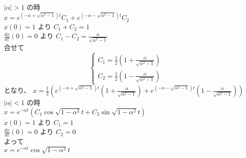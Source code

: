 \documentclass[12pt,a4]{article}
\begin{document}
\medskip
\noindent
$ | \alpha | > 1 $ の時 \\
$ x = e^{(-\alpha+\sqrt{\alpha^2-1})t} C_1 + e^{(-\alpha-\sqrt{\alpha^2-1})t} C_2 $\\
$ x(0) = 1 $ より $ C_1 + C_2 = 1 $ \\
$ \frac{dx}{dt}(0) = 0 $ より $ C_1 - C_2 = \frac{\alpha}{\sqrt{\alpha^2-1}} $ \\
合せて \\
\[
\begin{cases}
  C_1 = \frac{1}{2}(1+\frac{\alpha}{\sqrt{\alpha^2-1}}) \\
  C_2 = \frac{1}{2}(1-\frac{\alpha}{\sqrt{\alpha^2-1}}) 
\end{cases}
\]
となり、
$ x = \frac{1}{2} (e^{(-\alpha+\sqrt{\alpha^2-1})t} (1+\frac{\alpha}{\sqrt{\alpha^2-1}}) + e^{(-\alpha-\sqrt{\alpha^2-1})t} (1-\frac{\alpha}{\sqrt{\alpha^2-1}})) $\\

\medskip
\noindent
$ | \alpha | < 1 $ の時 \\
$ x = e^{-\alpha t}(C_1 \cos{\sqrt{1-\alpha^2}t} + C_2 \sin{\sqrt{1-\alpha^2}t}) $\\
$ x(0) = 1 $ より $ C_1 = 1 $ \\
$ \frac{dx}{dt}(0) = 0 $ より $ C_2 = 0 $ \\
よって \\
$ x = e^{-\alpha t} \cos{\sqrt{1-\alpha^2}t}  $
\end{document}
